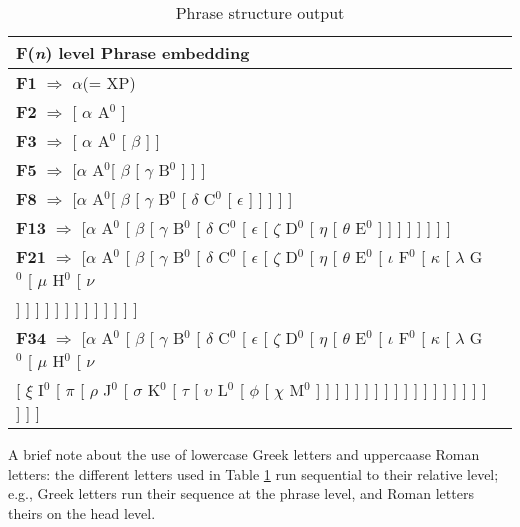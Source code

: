 \documentclass[11pt,twoside]{article}
\begin{document}
\begin{table}[!hbp]\caption{Phrase structure output}\label{psop}
\begin{tabular}{l@{}l}
F(\textsl{n}) level Phrase embedding\\
\hline

$\mathbf{F1}$ $\Rightarrow$ $\alpha$(= XP) \\

$\mathbf{F2}$  $\Rightarrow$ [ $\alpha$ A$^{0}$ ]\\

$\mathbf{F3}$ $\Rightarrow$ [ $\alpha$ A$^{0}$ [ $\beta$ ] ] \\

$\mathbf{F5}$ $\Rightarrow$ [$\alpha$ A$^{0}$[ $\beta$ [ $\gamma$ B$^{0}$ ] ] ] \\

$\mathbf{F8}$ $\Rightarrow$ [$\alpha$ A$^{0}$[ $\beta$ [ $\gamma$ B$^{0}$ [ $\delta$ C$^{0}$ [ $\epsilon$ ] ] ] ] ] \\

$\mathbf{F13}$ $\Rightarrow$ [$\alpha$ A$^{0}$ [ $\beta$ [ $\gamma$ B$^{0}$ [ $\delta$ C$^{0}$ [ $\epsilon$ [ $\zeta$ D$^{0}$ [ $\eta$ [ $\theta$ E$^{0}$ ] ] ] ] ] ] ] ] \\

$\mathbf{F21}$ $\Rightarrow$ [$\alpha$ A$^{0}$ [ $\beta$ [ $\gamma$ B$^{0}$ [ $\delta$ C$^{0}$ [ $\epsilon$ [ $\zeta$ D$^{0}$ [ $\eta$ [ $\theta$ E$^{0}$ [ $\iota$ F$^{0}$ [ $\kappa$ [ $\lambda$ G$^{0}$ [ $\mu$ H$^{0}$ [ $\nu$ \\

\hspace*{0.3cm}] ] ] ] ] ] ] ] ] ] ] ] ] \\

$\mathbf{F34}$ $\Rightarrow$ [$\alpha$ A$^{0}$ [ $\beta$  [ $\gamma$ B$^{0}$ [ $\delta$ C$^{0}$ [ $\epsilon$ [ $\zeta$ D$^{0}$ [ $\eta$ [ $\theta$ E$^{0}$ [ $\iota$ F$^{0}$ [ $\kappa$ [ $\lambda$ G$^{0}$ [ $\mu$ H$^{0}$ [ $\nu$ \\

\hspace*{0.3cm}[ $\xi$ I$^{0}$ [ $\pi$ [ $\rho$ J$^{0}$ [ $\sigma$ K$^{0}$ [ $\tau$ [ $\upsilon$ L$^{0}$ [ $\phi$ [ $\chi$ M$^{0}$ ] ] ] ] ] ] ] ] ] ] ] ] ] ] ] ] ] ] ] ] ]\\
\end{tabular}
\end{table}

A brief note about the use of lowercase Greek letters and uppercaase Roman letters: the different letters used in Table \ref{psop} run sequential to their relative level; e.g., Greek letters run their sequence at the phrase level, and Roman letters theirs on the head level.\newpage
\end{document}
